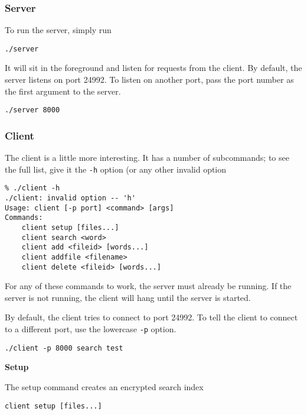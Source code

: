 \subsubsection{Server}

To run the server, simply run

\begin{lstlisting}
./server
\end{lstlisting}

It will sit in the foreground and listen for requests from the client.
By default, the server listens on port 24992.
To listen on another port, pass the port number as the first argument to the server.

\begin{lstlisting}
./server 8000
\end{lstlisting}

\subsubsection{Client}

The client is a little more interesting.
It has a number of subcommands;
to see the full list, give it the \texttt{-h} option (or any other invalid option

\begin{lstlisting}
% ./client -h
./client: invalid option -- 'h'
Usage: client [-p port] <command> [args]
Commands:
    client setup [files...]
    client search <word>
    client add <fileid> [words...]
    client addfile <filename>
    client delete <fileid> [words...]
\end{lstlisting}

For any of these commands to work, the server must already be running.
If the server is not running, the client will hang until the server is started.

By default, the client tries to connect to port 24992.
To tell the client to connect to a different port, use the lowercase \texttt{-p} option.

\begin{lstlisting}
./client -p 8000 search test
\end{lstlisting}


\noindent\textbf{Setup}

The setup command creates an encrypted search index

\begin{lstlisting}
client setup [files...]
\end{lstlisting}

